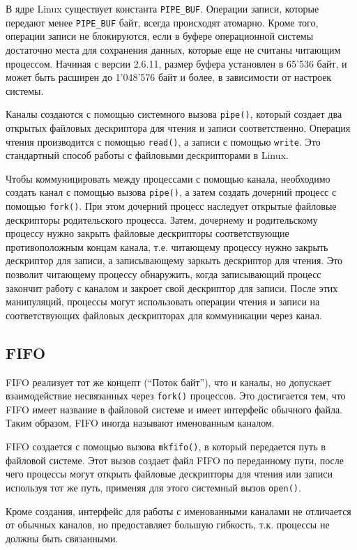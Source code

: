 \documentclass[14pt, russian]{scrartcl}
\begin{document}
В ядре Linux существует константа \verb|PIPE_BUF|. Операции записи, которые
передают менее \verb|PIPE_BUF| байт, всегда происходят атомарно. Кроме того,
операции записи не блокируются, если в буфере операционной системы достаточно
места для сохранения данных, которые еще не считаны читающим процессом. Начиная
с версии 2.6.11, размер буфера установлен в 65'536 байт, и может быть расширен
до 1'048'576 байт и более, в зависимости от настроек системы.

Каналы создаются с помощью системного вызова \verb|pipe()|, который создает два
открытых файловых дескриптора для чтения и записи соответственно. Операция
чтения производится с помощью \verb|read()|, а записи с помощью \verb|write|.
Это стандартный способ работы с файловыми дескрипторами в Linux.

Чтобы коммуницировать между процессами с помощью канала, необходимо создать
канал с помощью вызова \verb|pipe()|, а затем создать дочерний процесс с помощью
\verb|fork()|. При этом дочерний процесс наследует открытые файловые дескрипторы
родительского процесса. Затем, дочернему и родительскому процессу нужно закрыть
файловые дескрипторы соответствующие противоположным концам канала, т.е.
читающему процессу нужно закрыть дескриптор для записи, а записывающему заркыть
дескриптор для чтения. Это позволит читающему процессу обнаружить, когда
записывающий процесс закончит работу с каналом и закроет свой дескриптор для
записи. После этих манипуляций, процессы могут использовать операции чтения и
записи на соответствующих файловых дескрипторах для коммуникации через канал.

\subsection{FIFO}

FIFO реализует тот же концепт (``Поток байт''), что и каналы, но допускает
взаимодействие несвязанных через \verb|fork()| процессов. Это достигается тем,
что FIFO имеет название в файловой системе и имеет интерфейс обычного файла.
Таким образом, FIFO иногда называют именованным каналом.

FIFO создается с помощью вызова \verb|mkfifo()|, в который передается путь в
файловой системе. Этот вызов создает файл FIFO по переданному пути, после чего
процессы могут открыть файловые дескрипторы для чтения или записи используя тот
же путь, применяя для этого системный вызов \verb|open()|.

Кроме создания, интерфейс для работы с именованными каналами не отличается от
обычных каналов, но предоставляет большую гибкость, т.к. процессы не должны быть
связанными.
\end{document}
